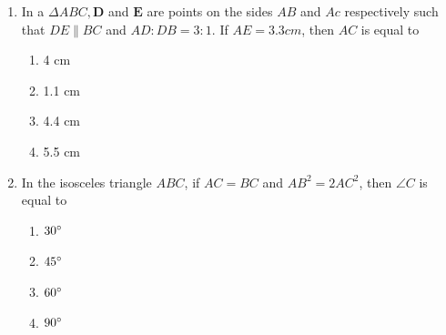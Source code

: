\documentclass{article}
\let\vec\mathbf
\begin{document}
\begin{enumerate}
\begin{enumerate}
\begin{enumerate}
				\end{enumerate}
			\item In a $ \Delta ABC, \vec{D} $ and $ \vec{E} $ are points on the sides $ AB $ and 
				$ Ac $ respectively such that $ DE \parallel BC $ and $ AD : DB = 3 :1 $. 
				If $ AE = 3.3 cm $, then $ AC $ is equal to
				\begin{enumerate}
					\item 4 cm
					\item 1.1 cm 
					\item 4.4 cm
					\item 5.5 cm
				\end{enumerate}
			\item In the isosceles triangle $ ABC $, if $ AC = BC $ and $ AB^2 = 2AC^2 $, then $ 
				\angle{C} $ is equal to
				\begin{enumerate}
					\item $ 30{\degree} $
					\item $ 45{\degree} $
					\item $ 60{\degree} $
					\item $ 90{\degree} $
				\end{enumerate}
		\end{enumerate}




\end{enumerate}
\end{document}
